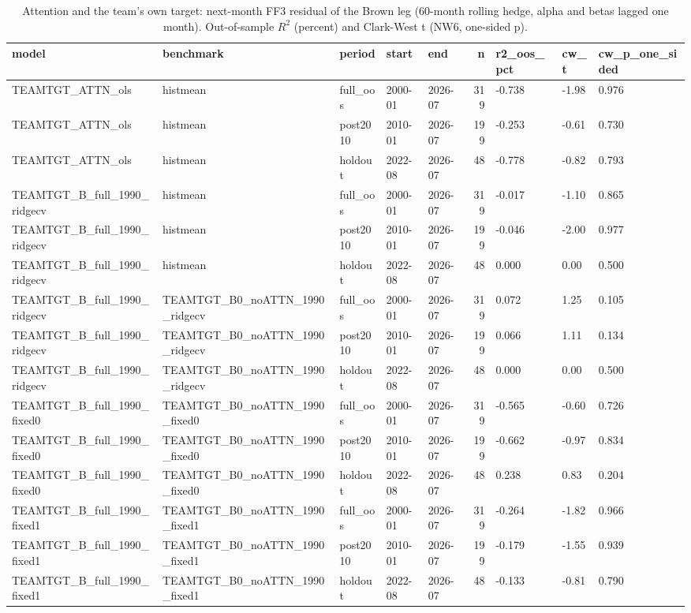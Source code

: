 \begin{table}
\caption{Attention and the team's own target: next-month FF3 residual of the Brown leg (60-month rolling hedge, alpha and betas lagged one month). Out-of-sample $R^2$ (percent) and Clark-West t (NW6, one-sided p).}
\label{tab:m6_team_target}
\begin{tabular}{lllllrlll}
\toprule
model & benchmark & period & start & end & n & r2\_oos\_pct & cw\_t & cw\_p\_one\_sided \\
\midrule
TEAMTGT\_ATTN\_ols & histmean & full\_oos & 2000-01 & 2026-07 & 319 & -0.738 & -1.98 & 0.976 \\
TEAMTGT\_ATTN\_ols & histmean & post2010 & 2010-01 & 2026-07 & 199 & -0.253 & -0.61 & 0.730 \\
TEAMTGT\_ATTN\_ols & histmean & holdout & 2022-08 & 2026-07 & 48 & -0.778 & -0.82 & 0.793 \\
TEAMTGT\_B\_full\_1990\_ridgecv & histmean & full\_oos & 2000-01 & 2026-07 & 319 & -0.017 & -1.10 & 0.865 \\
TEAMTGT\_B\_full\_1990\_ridgecv & histmean & post2010 & 2010-01 & 2026-07 & 199 & -0.046 & -2.00 & 0.977 \\
TEAMTGT\_B\_full\_1990\_ridgecv & histmean & holdout & 2022-08 & 2026-07 & 48 & 0.000 & 0.00 & 0.500 \\
TEAMTGT\_B\_full\_1990\_ridgecv & TEAMTGT\_B0\_noATTN\_1990\_ridgecv & full\_oos & 2000-01 & 2026-07 & 319 & 0.072 & 1.25 & 0.105 \\
TEAMTGT\_B\_full\_1990\_ridgecv & TEAMTGT\_B0\_noATTN\_1990\_ridgecv & post2010 & 2010-01 & 2026-07 & 199 & 0.066 & 1.11 & 0.134 \\
TEAMTGT\_B\_full\_1990\_ridgecv & TEAMTGT\_B0\_noATTN\_1990\_ridgecv & holdout & 2022-08 & 2026-07 & 48 & 0.000 & 0.00 & 0.500 \\
TEAMTGT\_B\_full\_1990\_fixed0 & TEAMTGT\_B0\_noATTN\_1990\_fixed0 & full\_oos & 2000-01 & 2026-07 & 319 & -0.565 & -0.60 & 0.726 \\
TEAMTGT\_B\_full\_1990\_fixed0 & TEAMTGT\_B0\_noATTN\_1990\_fixed0 & post2010 & 2010-01 & 2026-07 & 199 & -0.662 & -0.97 & 0.834 \\
TEAMTGT\_B\_full\_1990\_fixed0 & TEAMTGT\_B0\_noATTN\_1990\_fixed0 & holdout & 2022-08 & 2026-07 & 48 & 0.238 & 0.83 & 0.204 \\
TEAMTGT\_B\_full\_1990\_fixed1 & TEAMTGT\_B0\_noATTN\_1990\_fixed1 & full\_oos & 2000-01 & 2026-07 & 319 & -0.264 & -1.82 & 0.966 \\
TEAMTGT\_B\_full\_1990\_fixed1 & TEAMTGT\_B0\_noATTN\_1990\_fixed1 & post2010 & 2010-01 & 2026-07 & 199 & -0.179 & -1.55 & 0.939 \\
TEAMTGT\_B\_full\_1990\_fixed1 & TEAMTGT\_B0\_noATTN\_1990\_fixed1 & holdout & 2022-08 & 2026-07 & 48 & -0.133 & -0.81 & 0.790 \\
\bottomrule
\end{tabular}
\end{table}
